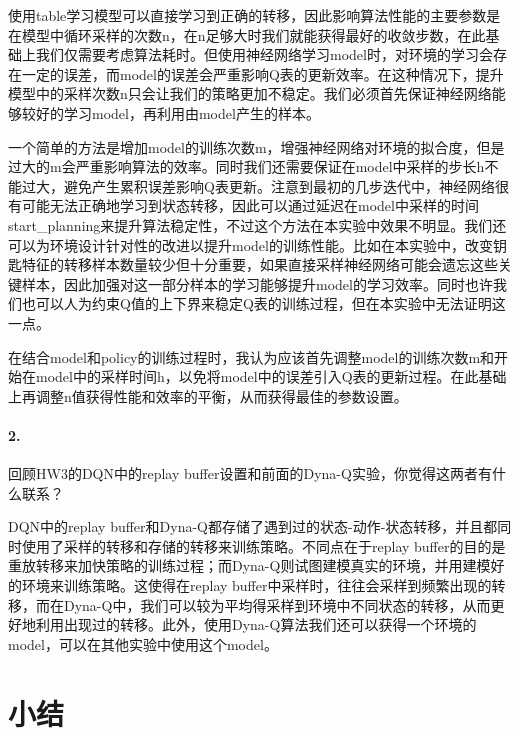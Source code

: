\documentclass[a4paper,12pt]{article}
\begin{document}
\begin{CJK}{UTF8}{gbsn}
使用table学习模型可以直接学习到正确的转移，因此影响算法性能的主要参数是在模型中循环采样的次数n，在n足够大时我们就能获得最好的收敛步数，在此基础上我们仅需要考虑算法耗时。但使用神经网络学习model时，对环境的学习会存在一定的误差，而model的误差会严重影响Q表的更新效率。在这种情况下，提升模型中的采样次数n只会让我们的策略更加不稳定。我们必须首先保证神经网络能够较好的学习model，再利用由model产生的样本。

一个简单的方法是增加model的训练次数m，增强神经网络对环境的拟合度，但是过大的m会严重影响算法的效率。同时我们还需要保证在model中采样的步长h不能过大，避免产生累积误差影响Q表更新。注意到最初的几步迭代中，神经网络很有可能无法正确地学习到状态转移，因此可以通过延迟在model中采样的时间start\_planning来提升算法稳定性，不过这个方法在本实验中效果不明显。我们还可以为环境设计针对性的改进以提升model的训练性能。比如在本实验中，改变钥匙特征的转移样本数量较少但十分重要，如果直接采样神经网络可能会遗忘这些关键样本，因此加强对这一部分样本的学习能够提升model的学习效率。同时也许我们也可以人为约束Q值的上下界来稳定Q表的训练过程，但在本实验中无法证明这一点。

在结合model和policy的训练过程时，我认为应该首先调整model的训练次数m和开始在model中的采样时间h，以免将model中的误差引入Q表的更新过程。在此基础上再调整n值获得性能和效率的平衡，从而获得最佳的参数设置。

\paragraph{2.}回顾HW3的DQN中的replay buffer设置和前面的Dyna-Q实验，你觉得这两者有什么联系？


DQN中的replay buffer和Dyna-Q都存储了遇到过的状态-动作-状态转移，并且都同时使用了采样的转移和存储的转移来训练策略。不同点在于replay buffer的目的是重放转移来加快策略的训练过程；而Dyna-Q则试图建模真实的环境，并用建模好的环境来训练策略。这使得在replay buffer中采样时，往往会采样到频繁出现的转移，而在Dyna-Q中，我们可以较为平均得采样到环境中不同状态的转移，从而更好地利用出现过的转移。此外，使用Dyna-Q算法我们还可以获得一个环境的model，可以在其他实验中使用这个model。

\section{小结}

\end{CJK}
\end{document}

